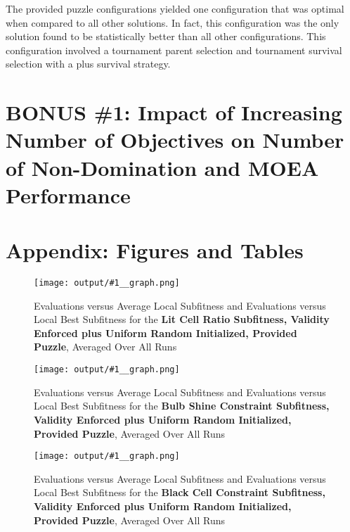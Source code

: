 \documentclass[11pt]{article}
\newcommand{\fitnessplotcaption}[1]{\caption{Evaluations versus Average Local Subfitness and Evaluations versus 
    Local Best Subfitness for the \textbf{{#1}}, Averaged Over All Runs}}
\newcommand{\addgraphic}[1]{\centerline{\texttt{[image: output/\#1\_\_graph.png]}}}
\begin{document}


The provided puzzle configurations yielded one configuration that was optimal when compared to all other solutions. In fact,
this configuration was the only solution found to be statistically better than all other configurations. This configuration involved
a tournament parent selection and tournament survival selection with a plus survival strategy.



\section{BONUS \#1: Impact of Increasing Number of Objectives on Number of Non-Domination and MOEA Performance}


\section{Appendix: Figures and Tables}



\begin{figure}
    \addgraphic{website_puzzle/website_puzzle_lit_cell_ratio}
    \fitnessplotcaption{Lit Cell Ratio Subfitness, Validity Enforced plus Uniform Random Initialized, Provided Puzzle}
    \label{fig:website_v_ratio}
\end{figure}

\begin{figure}
    \addgraphic{website_puzzle/website_puzzle_bulb_shine_constr}
    \fitnessplotcaption{Bulb Shine Constraint Subfitness, Validity Enforced plus Uniform Random Initialized, Provided Puzzle}
    \label{fig:website_v_shine}
\end{figure}

\begin{figure}
    \addgraphic{website_puzzle/website_puzzle_black_cell_constr}
    \fitnessplotcaption{Black Cell Constraint Subfitness, Validity Enforced plus Uniform Random Initialized, Provided Puzzle}
    \label{fig:website_v_black}
\end{figure}
\end{document}

